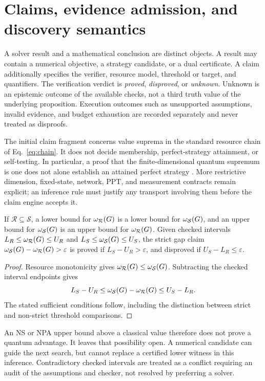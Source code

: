 \section{Claims, evidence admission, and discovery semantics}
\label{sec:claims}

A solver result and a mathematical conclusion are distinct objects. A result
may contain a numerical objective, a strategy candidate, or a dual certificate.
A claim additionally specifies the verifier, resource model, threshold or
target, and quantifiers. The verification verdict is \emph{proved},
\emph{disproved}, or \emph{unknown}. Unknown is an epistemic outcome of the
available checks, not a third truth value of the underlying proposition.
Execution outcomes such as unsupported assumptions, invalid evidence, and
budget exhaustion are recorded separately and never treated as disproofs.

The initial claim fragment concerns value suprema in the standard resource
chain of Eq.~\eqref{eq:chain}. It does not decide membership, perfect-strategy
attainment, or self-testing. In particular, a proof that the finite-dimensional
quantum supremum is one does not alone establish an attained perfect strategy
\cite{slofstra2019}. More restrictive dimension, fixed-state, network, PPT, and
measurement contracts remain explicit; an inference rule must justify any
transport involving them before the claim engine accepts it.

\begin{proposition}
If $\mathcal R\subseteq\mathcal S$, a lower bound for
$\omega_{\mathcal R}(G)$ is a lower bound for $\omega_{\mathcal S}(G)$,
and an upper bound for $\omega_{\mathcal S}(G)$ is an upper bound for
$\omega_{\mathcal R}(G)$. Given checked intervals
$L_R\leq\omega_{\mathcal R}(G)\leq U_R$ and
$L_S\leq\omega_{\mathcal S}(G)\leq U_S$, the strict gap claim
$\omega_{\mathcal S}(G)-\omega_{\mathcal R}(G)>\varepsilon$ is proved if
$L_S-U_R>\varepsilon$, and disproved if $U_S-L_R\leq\varepsilon$.
\end{proposition}
\begin{proof}
Resource monotonicity gives
$\omega_{\mathcal R}(G)\leq\omega_{\mathcal S}(G)$. Subtracting the checked
interval endpoints gives
\[
 L_S-U_R\leq\omega_{\mathcal S}(G)-\omega_{\mathcal R}(G)\leq U_S-L_R.
\]
The stated sufficient conditions follow, including the distinction between
strict and non-strict threshold comparisons.
\end{proof}
An NS or NPA upper bound above a classical value therefore does not prove a
quantum advantage. It leaves that possibility open. A numerical candidate can
guide the next search, but cannot replace a certified lower witness in this
inference. Contradictory checked intervals are treated as a conflict requiring
an audit of the assumptions and checker, not resolved by preferring a solver.

